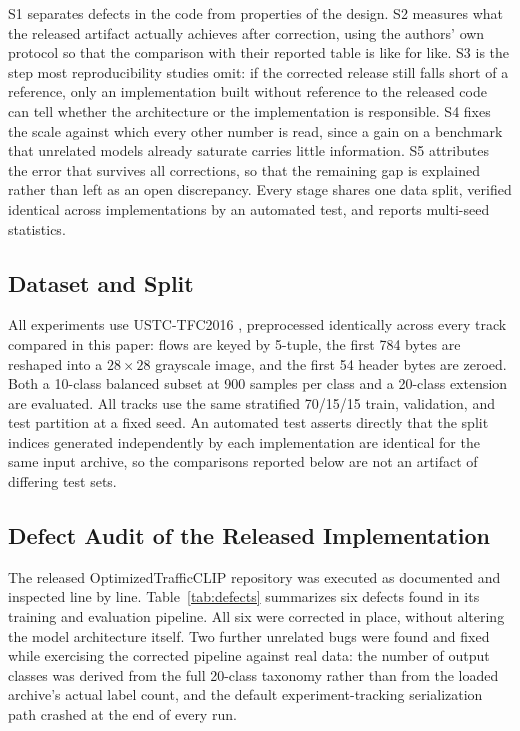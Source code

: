 \documentclass[journal]{IEEEtran}
\begin{document}
S1 separates defects in the code from properties of the design. S2 measures what the released artifact actually achieves after correction, using the authors' own protocol so that the comparison with their reported table is like for like. S3 is the step most reproducibility studies omit: if the corrected release still falls short of a reference, only an implementation built without reference to the released code can tell whether the architecture or the implementation is responsible. S4 fixes the scale against which every other number is read, since a gain on a benchmark that unrelated models already saturate carries little information. S5 attributes the error that survives all corrections, so that the remaining gap is explained rather than left as an open discrepancy. Every stage shares one data split, verified identical across implementations by an automated test, and reports multi-seed statistics.


\subsection{Dataset and Split}\label{sec:data}
All experiments use USTC-TFC2016 \cite{ustc}, preprocessed identically across every track compared in this paper: flows are keyed by 5-tuple, the first 784 bytes are reshaped into a $28 \times 28$ grayscale image, and the first 54 header bytes are zeroed. Both a 10-class balanced subset at 900 samples per class and a 20-class extension are evaluated. All tracks use the same stratified 70/15/15 train, validation, and test partition at a fixed seed. An automated test asserts directly that the split indices generated independently by each implementation are identical for the same input archive, so the comparisons reported below are not an artifact of differing test sets.

\subsection{Defect Audit of the Released Implementation}
The released OptimizedTrafficCLIP repository was executed as documented and inspected line by line. Table~\ref{tab:defects} summarizes six defects found in its training and evaluation pipeline. All six were corrected in place, without altering the model architecture itself. Two further unrelated bugs were found and fixed while exercising the corrected pipeline against real data: the number of output classes was derived from the full 20-class taxonomy rather than from the loaded archive's actual label count, and the default experiment-tracking serialization path crashed at the end of every run.
\end{document}
